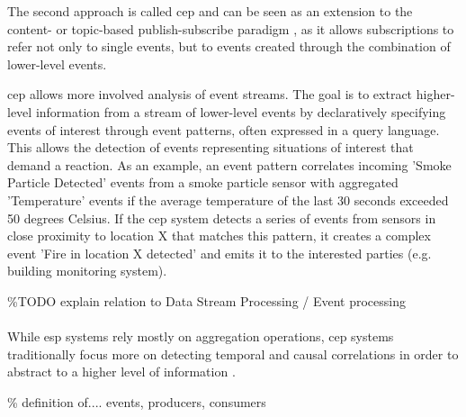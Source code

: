 The second approach is called \gls{cep} and can be seen as an extension to the content- or topic-based publish-subscribe paradigm \cite{Cugola2012}, as it allows subscriptions to refer not only to single events, but to events created through the combination of lower-level events.

\gls{cep} allows more involved analysis of event streams. The goal is to extract higher-level information from a stream of lower-level events by declaratively specifying events of interest through event patterns, often expressed in a query language. This allows the detection of events representing situations of interest that demand a reaction. As an example, an event pattern correlates incoming 'Smoke Particle Detected' events from a smoke particle sensor with aggregated 'Temperature' events if the average temperature of the last 30 seconds exceeded 50 degrees Celsius. If the \gls{cep} system detects a series of events from sensors in close proximity to location X that matches this pattern, it creates a complex event 'Fire in location X detected' and emits it to the interested parties (e.g. building monitoring system). 

\%TODO explain relation to Data Stream Processing / Event processing \\ \\
While \gls{esp} systems rely mostly on aggregation operations, \gls{cep} systems traditionally focus more on detecting temporal and causal correlations in order to abstract to a higher level of information \cite{Cugola2012}. 

\% definition of.... events, producers, consumers \\

